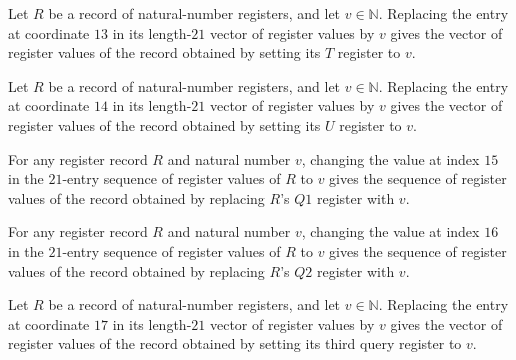 \begin{lemma}
\label{Complexity.Codec.Regs.upd_T}
\leanok
{}
Let $R$ be a record of natural-number registers, and let $v\in\mathbb N$. Replacing the
entry at coordinate $13$ in its length-$21$ vector of register values by $v$ gives the
vector of register values of the record obtained by setting its $T$ register to $v$.
\end{lemma}

\begin{lemma}
\label{Complexity.Codec.Regs.upd_U}
\leanok
{}
Let $R$ be a record of natural-number registers, and let $v\in\mathbb N$. Replacing the
entry at coordinate $14$ in its length-$21$ vector of register values by $v$ gives the
vector of register values of the record obtained by setting its $U$ register to $v$.
\end{lemma}

\begin{lemma}
\label{Complexity.Codec.Regs.upd_Q1}
\leanok
{}
For any register record $R$ and natural number $v$, changing the value at index $15$ in
the $21$-entry sequence of register values of $R$ to $v$ gives the sequence of register
values of the record obtained by replacing $R$'s $Q1$ register with $v$.
\end{lemma}

\begin{lemma}
\label{Complexity.Codec.Regs.upd_Q2}
\leanok
{}
For any register record $R$ and natural number $v$, changing the value at index $16$ in
the $21$-entry sequence of register values of $R$ to $v$ gives the sequence of register
values of the record obtained by replacing $R$'s $Q2$ register with $v$.
\end{lemma}

\begin{lemma}
\label{Complexity.Codec.Regs.upd_Q3}
\leanok
{}
Let $R$ be a record of natural-number registers, and let $v\in\mathbb N$. Replacing the
entry at coordinate $17$ in its length-$21$ vector of register values by $v$ gives the
vector of register values of the record obtained by setting its third query register to
$v$.
\end{lemma}

